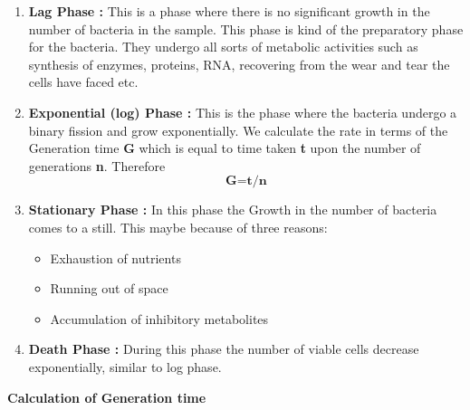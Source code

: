 \begin{enumerate}
    \item \textbf{Lag Phase :} This is a phase where there is no significant growth in the number of bacteria in the sample. This phase is kind of the preparatory phase for the bacteria. They undergo all sorts of metabolic activities such as synthesis of enzymes, proteins, RNA, recovering from the wear and tear the cells have faced etc.
    
    \item \textbf{Exponential (log) Phase :} This is the phase where the bacteria undergo a binary fission and grow exponentially. We calculate the rate in terms of the Generation time \textbf{G} which is equal to time taken \textbf{t} upon the number of generations \textbf{n}. Therefore
    \begin{equation}
        \textbf{G}=\textbf{t/n}
        \label{eqn:generationTime}
    \end{equation}
    
    \item \textbf{Stationary Phase :} In this phase the Growth in the number of bacteria comes to a still. This maybe because of three reasons:
    \begin{itemize}
        \item Exhaustion of nutrients
        \item Running out of space
        \item Accumulation of inhibitory metabolites
    \end{itemize}
    
    \item \textbf{Death Phase :} During this phase the number of viable cells decrease exponentially, similar to log phase.

    \begin{center}
	\end{center}
	
\end{enumerate} 
\textbf{\Large{Calculation of Generation time}} \\

